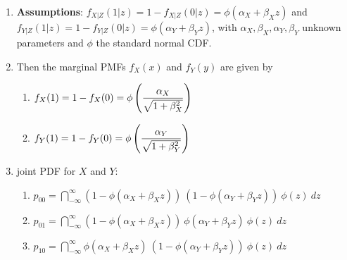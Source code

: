 \begin{enumerate}
    \item \textbf{Assumptions}:  $f_{X|Z} (1|z) = 1 - f_{X|Z} (0|z) = \phi(\alpha_X + \beta_X z)$ and $f _{Y |Z} (1|z) = 1 - f_{Y |Z} (0|z) = \phi(\alpha_Y + \beta_Y z)$, with $\alpha_X , \beta_X , \alpha_Y , \beta_Y$ unknown parameters and $\phi$ the standard normal CDF. 
    \hfill \cite{statistics/book/Statistics-for-Data-Scientists/Maurits-Kaptein}

    \item Then the marginal PMFs $f_X (x)$ and $f_Y (y)$ are given by
    \begin{multicols}{2}
    \begin{enumerate}
        \item 
        $
            f_X (1) 
            = 1 - f_X (0) 
            = \phi\left(\dfrac{\alpha_X}{\sqrt{1 + \beta^2_X}}\right)
        $
        \hfill \cite{statistics/book/Statistics-for-Data-Scientists/Maurits-Kaptein}

        \item 
        $
            f_Y (1) 
            = 1 - f_Y (0) 
            = \phi\left(\dfrac{\alpha_Y}{\sqrt{1 + \beta^2_Y}}\right)
        $
        \hfill \cite{statistics/book/Statistics-for-Data-Scientists/Maurits-Kaptein}
    \end{enumerate}
    \end{multicols}

    \item joint PDF for $X$ and $Y$:
    \begin{enumerate}
        \item 
        $
            p_{00} 
            = \dint ^{\infty} _{-\infty} (1 - \phi(\alpha_X + \beta_X z))\ (1 - \phi(\alpha_Y + \beta_Y z))\ \phi(z)\ dz
        $
        \hfill \cite{statistics/book/Statistics-for-Data-Scientists/Maurits-Kaptein}

        \item 
        $
            p_{01} 
            = \dint ^{\infty} _{-\infty} (1 - \phi(\alpha_X + \beta_X z))\ \phi(\alpha_Y + \beta_Y z)\ \phi(z)\ dz
        $
        \hfill \cite{statistics/book/Statistics-for-Data-Scientists/Maurits-Kaptein}

        \item 
        $
            p_{10} 
            = \dint ^{\infty} _{-\infty} \phi(\alpha_X + \beta_X z)\ (1 - \phi(\alpha_Y + \beta_Y z))\ \phi(z)\ dz
        $
        \hfill \cite{statistics/book/Statistics-for-Data-Scientists/Maurits-Kaptein}


\end{enumerate}
\end{enumerate}
